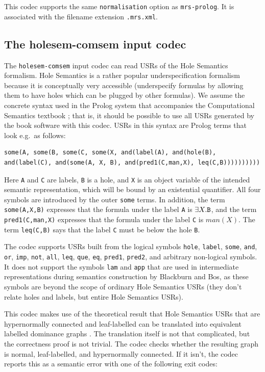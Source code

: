 This codec supports the same \verb?normalisation? option as \verb?mrs-prolog?. It is associated with the filename extension \verb|.mrs.xml|.



\subsection{The holesem-comsem input codec}

The \verb?holesem-comsem? input codec can read USRs of the Hole
Semantics formalism. Hole Semantics \cite{Bos96} is a rather popular
underspecification formalism because it is conceptually very
accessible (underspecify formulas by allowing them to have holes which
can be plugged by other formulas). We assume the concrete syntax used
in the Prolog system that accompanies the Computational Semantics
textbook \cite{blackburn05:_repres_infer_natur_languag}; that is, it
should be possible to use all USRs generated by the book software with
this codec. USRs in this syntax are Prolog terms that look e.g.\ as
follows:

\begin{verbatim}
some(A, some(B, some(C, some(X, and(label(A), and(hole(B),
and(label(C), and(some(A, X, B), and(pred1(C,man,X), leq(C,B))))))))))
\end{verbatim}

Here \verb?A? and \verb?C? are labels, \verb?B? is a hole, and
\verb?X? is an object variable of the intended semantic
representation, which will be bound by an existential quantifier. All
four symbols are introduced by the outer \verb?some? terms. In
addition, the term \verb?some(A,X,B)? expresses that the formula under
the label \verb?A? is $\exists X. \verb?B?$, and the term
\verb?pred1(C,man,X)? expresses that the formula under the label
\verb?C? is $man(X)$. The term \verb?leq(C,B)? says that the label
\verb?C? must be below the hole \verb?B?.

The codec supports USRs built from the logical symbols \verb?hole?,
\verb?label?, \verb?some?, \verb?and?, \verb?or?, \verb?imp?,
\verb?not?, \verb?all?, \verb?leq?, \verb?que?, \verb?eq?,
\verb?pred1?, \verb?pred2?, and arbitrary non-logical symbols. It does
not support the symbols \verb?lam? and \verb?app? that are used in
intermediate representations during semantics construction by
Blackburn and Bos, as these symbols are beyond the scope of ordinary
Hole Semantics USRs (they don't relate holes and labels, but entire
Hole Semantics USRs).

This codec makes use of the theoretical result that Hole Semantics
USRs that are hypernormally connected and leaf-labelled can be
translated into equivalent labelled dominance graphs
\cite{KolNieTha03}. The translation itself is not that complicated,
but the correctness proof is not trivial. The codec checks whether the
resulting graph is normal, leaf-labelled, and hypernormally
connected. If it isn't, the codec reports this as a semantic error
with one of the following exit codes:

